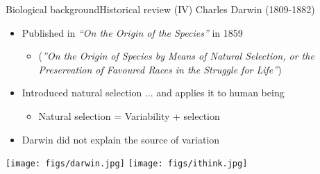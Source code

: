 \documentclass[10pt,compress]{beamer} %
\begin{document}
\begin{frame}{Biological background}{Historical review (IV)}
	Charles Darwin (1809-1882)
	\begin{itemize}
		\item Published in \textit{``On the Origin of the Species''} in 1859
			\begin{itemize}
			\item[] \small{(\textit{''On the Origin of Species by Means of Natural Selection, or the Preservation of Favoured Races in the Struggle for Life''})}
			\end{itemize}
		\item Introduced \alert{natural selection} ... and applies it to human being
			\begin{itemize}
			\item Natural selection = Variability + selection
			\end{itemize}
		\item Darwin did not explain the source of variation
	\end{itemize}
	\begin{center}
	\texttt{[image: figs/darwin.jpg]}\hspace{1cm}
	\texttt{[image: figs/ithink.jpg]}
	\end{center}
\end{frame}
\end{document}
